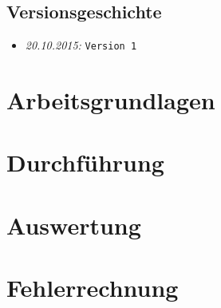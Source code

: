 \documentclass{fhnwreport/fhnwreport}
\begin{document}


\pagestyle{empty}
{
    \renewcommand{\thispagestyle}[1]{}
    \tableofcontents
    \vspace{30mm}
    \subsection*{Versionsgeschichte}
    \begin{itemize}
        \item[]
            \emph{20.10.2015:} \texttt{Version 1}
    \end{itemize}
}

\clearpage
\setcounter{page}{1}
\pagestyle{headings}

\clearpage
\section{Arbeitsgrundlagen}
\label{sec:arbeitsgrundlagen}



\clearpage
\section{Durchf\"uhrung}
\label{sec:durchfuehrung}



\clearpage
\section{Auswertung}
\label{sec:auswertung}



\clearpage
\section{Fehlerrechnung}
\label{sec:fehlerrechnung}

\end{document}
